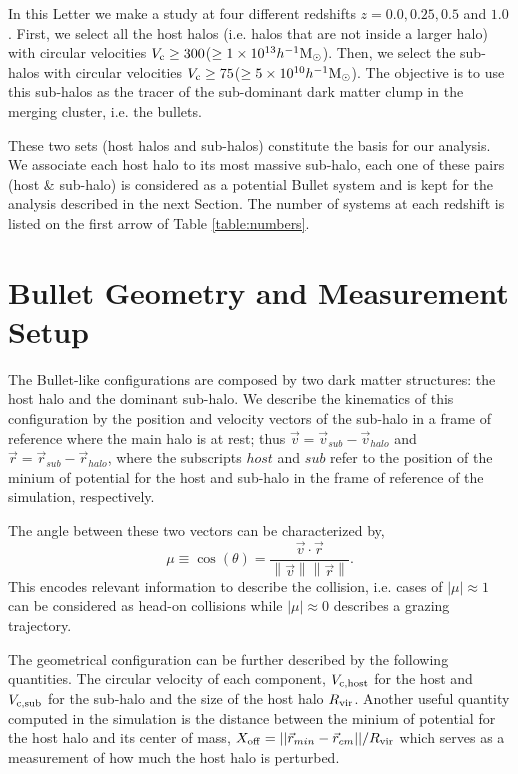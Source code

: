 \documentclass{emulateapj}
\newcommand{\hMsun}{{\ifmmode{h^{-1}{\rm {M_{\odot}}}}\else{$h^{-1}{\rm{M_{\odot}}}$}\fi}}
\newcommand{\kms}{{\ifmmode{{\mathrm{\,km\ s}^{-1}}}\else{\,km~s$^{-1}$}\fi}}
\begin{document}
In this Letter we make a study at four different redshifts $z=0.0,0.25,
0.5$ and $1.0$. First, we select all the host halos (i.e. halos that
are not inside a larger halo) with circular velocities $V_{\rm c}\geq
300$\kms ($\geq 1\times 10^{13} \hMsun$). Then, we select the sub-halos with
circular velocities $V_{\rm c}\geq 75$\kms ($\geq 5\times
10^{10}\hMsun$). The objective is to use this sub-halos as the tracer
of the sub-dominant dark matter clump in the merging cluster, i.e. the
bullets. 

These two sets (host halos and sub-halos)
constitute the basis for our analysis. We associate each host halo
to its most massive sub-halo, each one of these pairs (host \& sub-halo)
is considered as a potential Bullet system and is kept for the
analysis described in the next Section. The number of systems at each
redshift is listed on the first arrow of Table \ref{table:numbers}.

\section{Bullet Geometry and Measurement Setup}
\label{sec:setup}

The Bullet-like configurations are composed by two dark matter
structures: the host halo and the dominant sub-halo. We describe the
kinematics of this configuration by the 
position and velocity vectors of the sub-halo in a frame of reference
where the main halo is at rest; thus
$\vec{v{}}=\vec{v}_{sub}-\vec{v}_{halo}$ and
$\vec{r}=\vec{r}_{sub}-\vec{r}_{halo}$, where the subscripts $host$
and $sub$ refer to the position of the minium of potential for the
host and sub-halo in the frame of reference of the simulation,
respectively.  

The angle between these two vectors can be characterized by, 
\begin{equation}
  \mu\equiv
  \cos(\theta)=\frac{\vec{v{}}\cdotp{}\vec{r}}{\left\|\vec{v}{}\right\|
    \left\|\vec{r}\right\|} .
 \end{equation} 
%
This encodes relevant information to describe the collision,
i.e. cases of $|\mu|\approx 1$ can be considered as head-on collisions
while $|\mu|\approx 0$ describes a grazing trajectory.

The geometrical configuration can be further described by the
following quantities. The circular velocity of each component, $V_{\rm
  c,host}$ for the host and $V_{\rm c, sub}$ for the sub-halo and the
size of the host halo $R_{\rm vir}$. Another useful quantity computed
in the simulation is the distance between the minium of potential for
the host halo and its center of mass, $X_{\rm
  off}=||\vec{r}_{min}-\vec{r}_{cm}||/R_{\rm vir}$ which serves as a
measurement of how much the host halo is perturbed.
\end{document}

